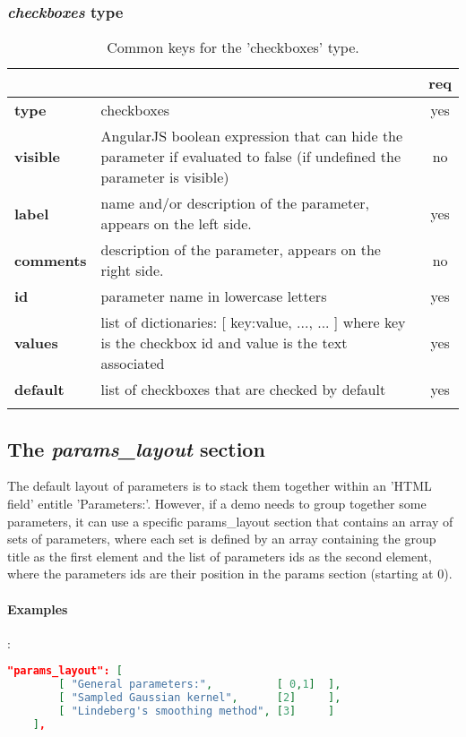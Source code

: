 \subsubsection{ \emph{checkboxes} type}

\begin{longtable}{|>{\bf}L{\linewidth}|L{\linewidth}|c|}
\hline
      &  & {\bf req} 
\tabularnewline \hline \hline
 type  & checkboxes   & yes \\ \hline
 visible  & AngularJS boolean expression that can hide the parameter if
            evaluated to false (if undefined the parameter is visible)& no \\ \hline
 label  & name and/or description of the parameter, appears on the left side. & yes
                      \\ \hline
 comments & description of the parameter, appears on the right side. & no
                      \\ \hline
 id         & parameter name in lowercase letters  & yes \\ \hline
 values     & list of dictionaries: [ {key:value, ...}, ... ]
            where key is the checkbox id and value is the text associated
            & yes \\ \hline
 default     & list of checkboxes that are checked by default  & yes \\ \hline
\caption{Common keys for the 'checkboxes' type.}
\end{longtable}


\subsection{The \emph{params\_layout} section}

The default layout of parameters is to stack them together within an 'HTML field'
entitle 'Parameters:'. However, if a demo needs to group together some parameters,
it can use a specific params\_layout section that contains an array of
sets of parameters, where each set is defined by an array containing the group 
title as the first element and the list of parameters ids as the second element,
where the parameters ids are their position in the params section (starting at 0).

\paragraph{Examples}:\\
\begin{lstlisting}[language=json,firstnumber=1]
  "params_layout": [
        [ "General parameters:",          [ 0,1]  ],
        [ "Sampled Gaussian kernel",      [2]     ],
        [ "Lindeberg's smoothing method", [3]     ]
    ],
\end{lstlisting}


